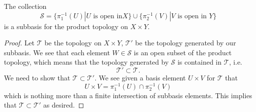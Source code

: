 \begin{thm}\label{thm:subBasisForProductTopology}
The collection
\begin{equation}%
\mathscr{S}=\{\pi_{1}^{-1}(U)|U\text{ is open in
}X\}\cup\{\pi_{2}^{-1}(V)|V\text{ is open in }Y\}
\end{equation}
is a subbasis for the product topology on $X\times Y$.
\end{thm}
\begin{proof}
Let $\mathcal{T}$ be the topology on $X\times Y$, $\mathcal{T}'$
be the topology generated by our subbasis. We see that each
element $W\in\mathscr{S}$ is an open subset of the product
topology, which means that the topology generated by
$\mathscr{S}$ is contained in $\mathcal{T}$, i.e.
\begin{equation}%
\mathcal{T}'\subset\mathcal{T}.
\end{equation}
We need to show that $\mathcal{T}\subset\mathcal{T}'$. We see
given a basis element $U\times V$ for $\mathcal{T}$ that
\begin{equation}%
U\times V = \pi_{1}^{-1}(U)\cap\pi_{2}^{-1}(V)
\end{equation}
which is nothing more than a finite intersection of subbasis
elements. This implies that $\mathcal{T}\subset\mathcal{T}'$ as desired.
\end{proof}
